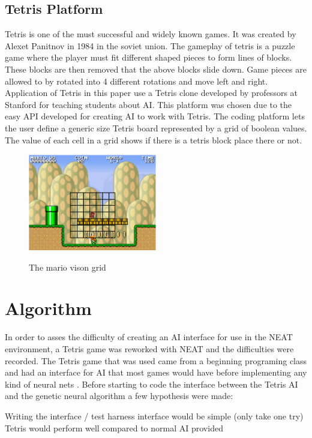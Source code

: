 \documentclass[12pt]{ucthesis} \newif\ifpdf \ifx\pdfoutput\undefined
\begin{document}
\section{Tetris Platform}

Tetris is one of the must successful and widely known games. It was created by
Alexet Panitnov in 1984 in the soviet union. The gameplay of tetris is a puzzle
game where the player must fit different shaped pieces to form lines of blocks.
These blocks are then removed that the above blocks slide down. Game pieces are
allowed to by rotated into 4 different rotations and move left and right.
Application of Tetris in this paper use a Tetris clone developed by professors
at Stanford for teaching students about AI. This platform was chosen due to the
easy API developed for creating AI to work with Tetris. The coding platform lets
the user define a generic size Tetris board represented by a grid of boolean
values. The value of each cell in a grid shows if there is a tetris block place
there or not.

\begin{figure}[h!] 
\caption{The mario vison grid}
  \centering
    \includegraphics[width=0.5\textwidth]{mariogrid.png}
   \label{fig:mariogrid} 
\end{figure}

\chapter{Algorithm}

In order to asses the difficulty of creating an AI interface for use in the NEAT
environment, a Tetris game was reworked with NEAT and the difficulties were
recorded. The Tetris game that was used came from a beginning programing class
and had an interface for AI that most games would have before implementing any
kind of neural nets \cite{tetris}. Before starting to code the interface between
the Tetris AI and the genetic neural algorithm a few hypothesis were made:

Writing the interface / test harness interface would be simple (only take one
try) Tetris would perform well compared to normal AI provided
\end{document}
